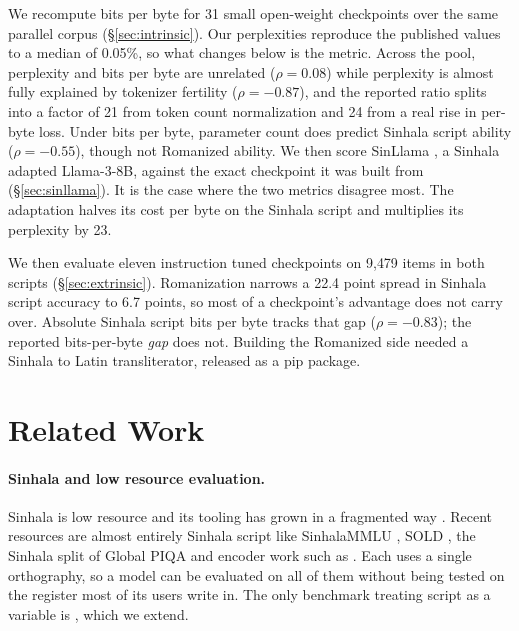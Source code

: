 \documentclass[11pt]{article}
\begin{document}
We recompute bits per byte for 31 small open-weight checkpoints over the same
parallel corpus (\S\ref{sec:intrinsic}). Our perplexities reproduce the published
values to a median of 0.05\%, so what changes below is the metric. Across the pool,
perplexity and bits per byte are unrelated ($\rho = 0.08$) while perplexity is almost
fully explained by tokenizer fertility ($\rho = -0.87$), and the reported ratio
splits into a factor of 21 from token count normalization and 24 from a real rise in
per-byte loss. Under bits per byte, parameter count does predict
Sinhala script ability ($\rho = -0.55$), though not Romanized ability. We then score
SinLlama \citep{aravinda2025sinllama}, a Sinhala adapted Llama-3-8B, against the exact
checkpoint it was built from (\S\ref{sec:sinllama}). It is the case where the two
metrics disagree most. The adaptation halves its cost per byte on the Sinhala script
and multiplies its perplexity by 23.

We then evaluate eleven instruction tuned checkpoints on 9{,}479 items in both
scripts (\S\ref{sec:extrinsic}). Romanization narrows a
22.4 point spread in Sinhala script accuracy to 6.7 points, so most of a checkpoint's
advantage does not carry over. Absolute Sinhala script bits per byte
tracks that gap ($\rho = -0.83$); the reported bits-per-byte \emph{gap} does not. Building the Romanized side needed a Sinhala to Latin transliterator, released
as a pip package.


\section{Related Work}
\label{sec:related}

\paragraph{Sinhala and low resource evaluation.}
Sinhala is low resource and its tooling has grown in a fragmented way
\citep{desilva-2019-survey, ranathunga-de-silva-2022-languages, joshi-etal-2020-state}.
Recent resources are almost entirely Sinhala script like SinhalaMMLU
\citep{pramodya-etal-2025-sinhalammlu}, SOLD \citep{ranasinghe-etal-2025-sold}, the
Sinhala split of Global PIQA \citep{desilva-ranathunga-2026-sinhalapiqa,
chang-etal-2025-globalpiqa} and encoder work such as
\citet{dhananjaya-etal-2022-bertifying}. Each uses a single orthography, so a model can be
evaluated on all of them without being tested on the register most of its users write in.
The only benchmark treating script as a variable is
\citet{rajapakse-weerasinghe-2026-script}, which we extend.
\end{document}

